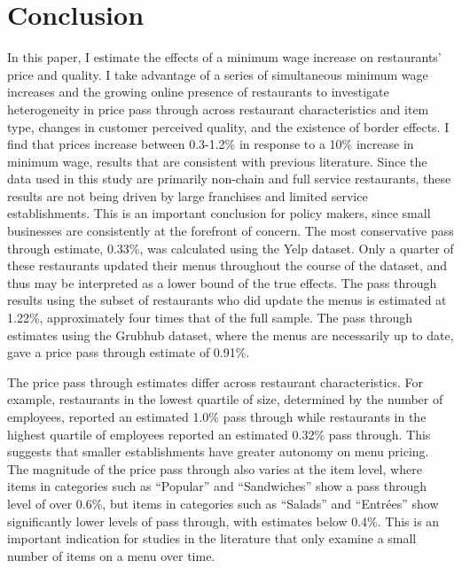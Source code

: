 \documentclass[11pt]{article}
\begin{document}
\section{Conclusion}
In this paper, I estimate the effects of a minimum wage increase on restaurants' price and quality. I take advantage of a series of simultaneous minimum wage increases and the growing online presence of restaurants to investigate heterogeneity in price pass through across restaurant characteristics and item type, changes in customer perceived quality, and the existence of border effects. I find that prices increase between 0.3-1.2\% in response to a 10\% increase in minimum wage, results that are consistent with previous literature. Since the data used in this study are primarily non-chain and full service restaurants, these results are not being driven by large franchises and limited service establishments. This is an important conclusion for policy makers, since small businesses are consistently at the forefront of concern. The most conservative pass through estimate, 0.33\%, was calculated using the Yelp dataset. Only a quarter of these restaurants updated their menus throughout the course of the dataset, and thus may be interpreted as a lower bound of the true effects. The pass through results using the subset of restaurants who did update the menus is estimated at 1.22\%, approximately four times that of the full sample. The pass through estimates using the Grubhub dataset, where the menus are necessarily up to date, gave a price pass through estimate of 0.91\%. 



The price pass through estimates differ across restaurant characteristics. For example, restaurants in the lowest quartile of size, determined by the number of employees, reported an estimated 1.0\% pass through while restaurants in the highest quartile of employees reported an estimated 0.32\% pass through. This suggests that smaller establishments have greater autonomy on menu pricing. The magnitude of the price pass through also varies at the item level, where items in categories such as ``Popular'' and ``Sandwiches'' show a pass through level of over 0.6\%, but items in categories such as ``Salads'' and ``Entrées'' show significantly lower levels of pass through, with estimates below 0.4\%. This is an important indication for studies in the literature that only examine a small number of items on a menu over time. 
\end{document}
